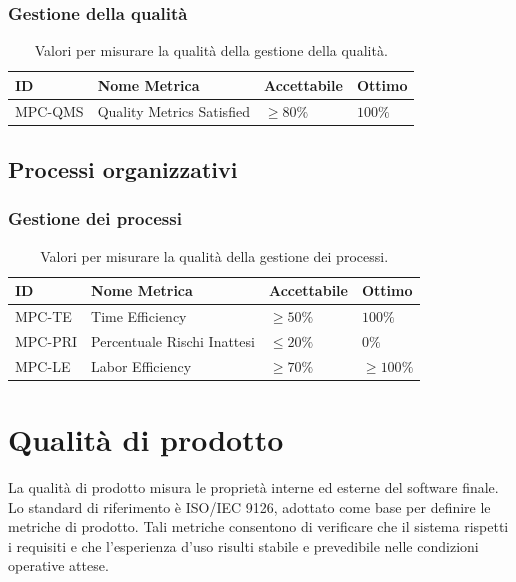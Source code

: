 \documentclass[a4paper,12pt]{article}
\begin{document}
\subsubsection{Gestione della qualità}
\begin{table}[H]
    \centering
    \renewcommand{\arraystretch}{1.2}
    \begin{tabularx}{\textwidth}{|p{2.4cm}|X|p{3cm}|p{3cm}|}
        \hline
        \rowcolor{gray!20}
        \textbf{ID} & \textbf{Nome Metrica} & \textbf{Accettabile} & \textbf{Ottimo} \\
        \hline
        MPC-QMS & Quality Metrics Satisfied & $\geq 80\%$ & $100\%$ \\
        \hline
    \end{tabularx}
    \caption{Valori per misurare la qualità della gestione della qualità.}
\end{table}

\subsection{Processi organizzativi}
\subsubsection{Gestione dei processi}
\begin{table}[H]
    \centering
    \renewcommand{\arraystretch}{1.2}
    \begin{tabularx}{\textwidth}{|p{2.4cm}|X|p{3cm}|p{3cm}|}
        \hline
        \rowcolor{gray!20}
        \textbf{ID} & \textbf{Nome Metrica} & \textbf{Accettabile} & \textbf{Ottimo} \\
        \hline
        MPC-TE & Time Efficiency & $\geq 50\%$ & $100\%$ \\
        MPC-PRI & Percentuale Rischi Inattesi & $\leq 20\%$ & $0\%$ \\
        MPC-LE & Labor Efficiency & $\geq 70\%$ & $\geq 100\%$ \\
        \hline
    \end{tabularx}
    \caption{Valori per misurare la qualità della gestione dei processi.}
\end{table}

\section{Qualità di prodotto}
La qualità di prodotto misura le proprietà interne ed esterne del software finale. Lo standard di riferimento è ISO/IEC 9126, adottato come base per definire le metriche di prodotto.
Tali metriche consentono di verificare che il sistema rispetti i requisiti e che l'esperienza d'uso risulti stabile e prevedibile nelle condizioni operative attese.
\end{document}
